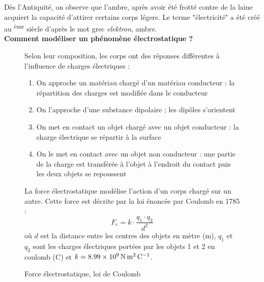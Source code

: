 \documentclass[a4paper,12pt,fleqn]{article}%
\begin{document}
	\maketitle
 Dès l'Antiquité, on observe que l'ambre, après avoir été frotté contre de la laine acquiert la capacité d'attirer certains corps légers. Le terme "électricité" a été créé au {}\textsuperscript{ème} siècle d'après le mot grec \textit{elektron}, ambre.\\
\textbf{Comment modéliser un phénomène électrostatique ?}

\begin{figure}[h!]
    \begin{minipage}{.49\linewidth}
        \caption{Électrisation par influence, électrisation par contact}
        Selon leur composition, les corps ont des réponses différentes à l'influence de charges électriques :
        \begin{enumerate}
            \item On approche un matériau chargé d'un matériau conducteur : la répartition des charges est modifiée dans le conducteur
            \item On l'approche d'une substance dipolaire ; les dipôles s'orientent
            \item On met en contact un objet chargé avec un objet conducteur : la charge électrique se répartir à la surface
            \item On le met en contact avec un objet non conducteur : une partie de la charge est transférée à l'objet à l'endroit du contact puis les deux objets se repoussent
        \end{enumerate}
    \end{minipage}
    \begin{minipage}{.49\linewidth}
        \caption{Force électrostatique, loi de Coulomb}
        La force électrostatique modélise l'action d'un corps chargé sur un autre. Cette force est décrite par la loi énoncée par Coulomb en 1785 : $$ F_e = k \cdot \dfrac{q_1 \cdot q_2}{d^2}$$
        où $d$ est la distance entre les centres des objets en mètre (\unit{\meter}), $q_1$ et $q_2$ sont les charges électriques portées par les objets 1 et 2 en coulomb (\unit{\coulomb}) et $k = \SI{8,99E9}{\newton\meter\squared\per\coulomb}$.
    \end{minipage}
\end{figure}
\end{document}
